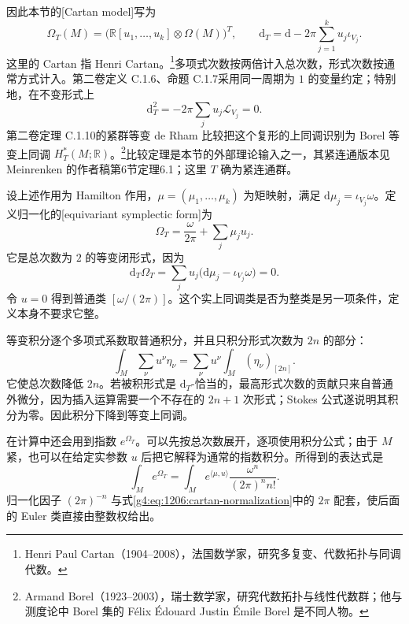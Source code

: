 因此本节的[Cartan model]写为
\begin{equation}\label{g4:eq:1206:cartan-normalization}
	\Omega_T(M)=\bigl(\mathbb R[u_1,\ldots,u_k]\otimes\Omega(M)\bigr)^T,
	\qquad
	\mathrm{d}_T=\mathrm{d}-2\pi\sum_{j=1}^k u_j\iota_{V_j}.
\end{equation}
这里的 Cartan 指 Henri Cartan。\footnote{Henri Paul Cartan（1904--2008），法国数学家，研究多复变、代数拓扑与同调代数。}多项式次数按两倍计入总次数，形式次数按通常方式计入。第二卷定义 C.1.6、命题 C.1.7采用同一周期为 \(1\) 的变量约定；特别地，在不变形式上
\[
	\mathrm{d}_T^2=-2\pi\sum_j u_j\mathcal L_{V_j}=0.
\]
第二卷定理 C.1.10的紧群等变 de Rham 比较把这个复形的上同调识别为 Borel 等变上同调 \(H_T^*(M;\mathbb R)\)。\footnote{Armand Borel（1923--2003），瑞士数学家，研究代数拓扑与线性代数群；他与测度论中 Borel 集的 Félix Édouard Justin Émile Borel 是不同人物。}比较定理是本节的外部理论输入之一，其紧连通版本见 Meinrenken 的作者稿第6节定理6.1；这里 \(T\) 确为紧连通群。\cite[作者稿第6节，定理6.1]{Meinrenken2006EquivariantCartan}

\begin{definition}\label{g4:def:1206:equivariant-symplectic-form}
	设上述作用为 Hamilton 作用，\(\mu=(\mu_1,\ldots,\mu_k)\) 为矩映射，满足 \(\mathrm{d}\mu_j=\iota_{V_j}\omega\)。定义归一化的[equivariant symplectic form]为
	\begin{equation}\label{g4:eq:1206:equivariant-omega}
		\Omega_T=\frac{\omega}{2\pi}+\sum_j\mu_j u_j.
	\end{equation}
	它是总次数为 \(2\) 的等变闭形式，因为
	\[
		\mathrm{d}_T\Omega_T
		=\sum_j u_j\bigl(\mathrm{d}\mu_j-\iota_{V_j}\omega\bigr)=0.
	\]
	令 \(u=0\) 得到普通类 \([\omega/(2\pi)]\)。这个实上同调类是否为整类是另一项条件，定义本身不要求它整。
\end{definition}

等变积分逐个多项式系数取普通积分，并且只积分形式次数为 \(2n\) 的部分：
\[
	\int_M\sum_\nu u^\nu\eta_\nu
	=\sum_\nu u^\nu\int_M(\eta_\nu)_{[2n]}.
\]
它使总次数降低 \(2n\)。若被积形式是 \(\mathrm{d}_T\)-恰当的，最高形式次数的贡献只来自普通外微分，因为插入运算需要一个不存在的 \(2n+1\) 次形式；Stokes 公式遂说明其积分为零。因此积分下降到等变上同调。

\ProseParagraphBreak

在计算中还会用到指数 \(e^{\Omega_T}\)。可以先按总次数展开，逐项使用积分公式；由于 \(M\) 紧，也可以在给定实参数 \(u\) 后把它解释为通常的指数积分。所得到的表达式是
\begin{equation}\label{g4:eq:1206:normalized-laplace}
	\int_M e^{\Omega_T}
	=\int_M e^{\langle\mu,u\rangle}
	\frac{\omega^n}{(2\pi)^n n!}.
\end{equation}
归一化因子 \((2\pi)^{-n}\) 与式\eqref{g4:eq:1206:cartan-normalization}中的 \(2\pi\) 配套，使后面的 Euler 类直接由整数权给出。

